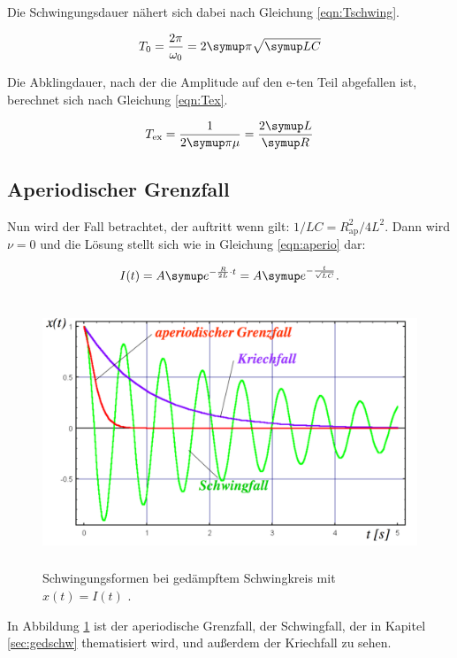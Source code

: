 Die Schwingungsdauer nähert sich dabei nach Gleichung \eqref{eqn:Tschwing}.

\begin{equation}
  T_{\text{0}} = \frac{2 \pi}{\omega_0} = 2 \g{\pi}\sqrt{\g{LC}}
  \label{eqn:Tschwing}
\end{equation}

Die Abklingdauer, nach der die Amplitude auf den e-ten Teil abgefallen ist,
berechnet sich nach Gleichung \eqref{eqn:Tex}.

\begin{equation}
  T_{\text{ex}} = \frac{1}{2\g{\pi}\mu} = \frac{2\g{L}}{\g{R}}
  \label{eqn:Tex}
\end{equation}

\subsection{Aperiodischer Grenzfall}

Nun wird der Fall betrachtet, der auftritt wenn gilt:
$1/LC = R_{\text{ap}}^2/4L^2$. Dann wird $\nu = 0$ und die Lösung stellt
sich wie in Gleichung \eqref{eqn:aperio} dar:

\begin{equation}
  I(t) = A \g{e}^{-\frac{R}{2L}\cdot t} = A \g{e}^{-\frac{t}{\sqrt{LC}}}.
  \label{eqn:aperio}
\end{equation}

\begin{figure}[h]
  \centering
  \includegraphics[height = 8cm]{aperio.pdf}
  \caption{Schwingungsformen bei gedämpftem Schwingkreis mit $x(t) = I(t)$ \cite{weis}.}
  \label{fig:aperio}
\end{figure}

In Abbildung \ref{fig:aperio} ist der aperiodische Grenzfall, der
Schwingfall, der in Kapitel \ref{sec:gedschw} thematisiert wird, und
außerdem der Kriechfall zu sehen.

